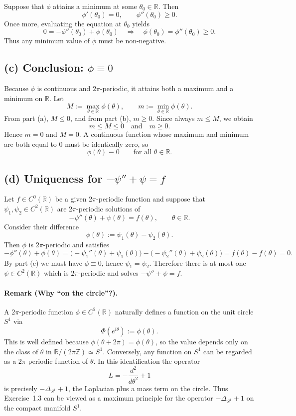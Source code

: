 \documentclass[12pt,a4paper]{article}
\theoremstyle{plain}
\theoremstyle{definition}
\theoremstyle{remark}
\theoremstyle{remark}
\begin{document}
Suppose that $\phi$ attains a minimum at some $\theta_0\in\mathbb{R}$.  Then
\[
\phi'(\theta_0) = 0, \qquad \phi''(\theta_0)\ge 0.
\]
Once more, evaluating the equation at $\theta_0$ yields
\[
0 = -\phi''(\theta_0)+\phi(\theta_0)
\quad\Longrightarrow\quad
\phi(\theta_0)=\phi''(\theta_0)\ge 0.
\]
Thus any minimum value of $\phi$ must be non-negative.

\subsection*{(c) Conclusion: $\phi\equiv 0$}

Because $\phi$ is continuous and $2\pi$-periodic, it attains both a maximum
and a minimum on $\mathbb{R}$.  Let
\[
M := \max_{\theta\in\mathbb{R}} \phi(\theta),
\qquad
m := \min_{\theta\in\mathbb{R}} \phi(\theta).
\]
From part (a), $M\le 0$, and from part (b), $m\ge 0$.  Since always
$m\le M$, we obtain
\[
m \le M \le 0
\quad\text{and}\quad
m\ge 0.
\]
Hence $m=0$ and $M=0$.  A continuous function whose maximum and minimum
are both equal to $0$ must be identically zero, so
\[
\phi(\theta)\equiv 0 \qquad\text{for all }\theta\in\mathbb{R}.
\]

\subsection*{(d) Uniqueness for $-\psi''+\psi=f$}

Let $f\in C^0(\mathbb{R})$ be a given $2\pi$-periodic function and suppose
that $\psi_1,\psi_2\in C^2(\mathbb{R})$ are $2\pi$-periodic solutions of
\[
-\psi''(\theta)+\psi(\theta) = f(\theta), \qquad \theta\in\mathbb{R}.
\]
Consider their difference
\[
\phi(\theta) := \psi_1(\theta)-\psi_2(\theta).
\]
Then $\phi$ is $2\pi$-periodic and satisfies
\[
-\phi''(\theta)+\phi(\theta)
= \bigl(-\psi_1''(\theta)+\psi_1(\theta)\bigr)
-\bigl(-\psi_2''(\theta)+\psi_2(\theta)\bigr)
= f(\theta)-f(\theta)
= 0.
\]
By part (c) we must have $\phi\equiv 0$, hence $\psi_1=\psi_2$.  Therefore
there is at most one $\psi\in C^2(\mathbb{R})$ which is $2\pi$-periodic and
solves $-\psi''+\psi=f$.

\paragraph{Remark (Why ``on the circle''?).}
A $2\pi$-periodic function $\phi\in C^2(\mathbb{R})$ naturally defines a
function on the unit circle $S^1$ via
\[
\Phi(e^{i\theta}) := \phi(\theta).
\]
This is well defined because $\phi(\theta+2\pi)=\phi(\theta)$, so the
value depends only on the class of $\theta$ in $\mathbb{R}/(2\pi\mathbb{Z})
\simeq S^1$.  Conversely, any function on $S^1$ can be regarded as a
$2\pi$-periodic function of $\theta$.  In this identification the operator
\[
L = -\frac{d^2}{d\theta^2} + 1
\]
is precisely $-\Delta_{S^1}+1$, the Laplacian plus a mass term on the
circle.  Thus Exercise~1.3 can be viewed as a maximum principle for the
operator $-\Delta_{S^1}+1$ on the compact manifold $S^1$.
\end{document}
